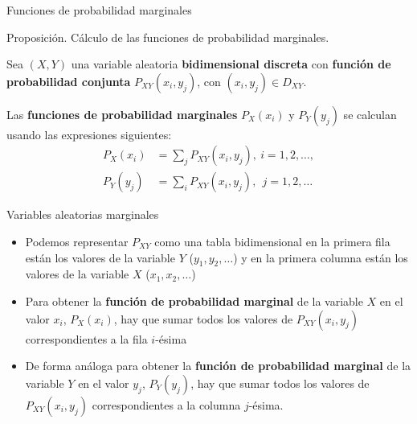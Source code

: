 \documentclass[ignorenonframetext,]{beamer}
\providecommand{\tightlist}{%
  \setlength{\itemsep}{0pt}\setlength{\parskip}{0pt}}
\begin{document}
\begin{frame}{Funciones de probabilidad marginales}
\protect\hypertarget{funciones-de-probabilidad-marginales}{}

Proposición. Cálculo de las funciones de probabilidad marginales.

Sea \((X,Y)\) una variable aleatoria \textbf{bidimensional discreta} con
\textbf{función de probabilidad conjunta} \(P_{XY}(x_i,y_j)\), con
\((x_i,y_j)\in D_{XY}\).

Las \textbf{funciones de probabilidad marginales} \(P_X(x_i)\) y
\(P_Y(y_j)\) se calculan usando las expresiones siguientes: \[
\displaystyle
\begin{array}{rl}
P_X(x_i)  & = \displaystyle\sum_{j} P_{XY}(x_i,y_j),\  i=1,2,\ldots,\\ P_Y(y_j) &  = \displaystyle\sum_{i} P_{XY}(x_i,y_j),\ \ j=1,2,\ldots
\end{array}
\]

\end{frame}

\begin{frame}{Variables aleatorias marginales}
\protect\hypertarget{variables-aleatorias-marginales}{}

\begin{itemize}
\tightlist
\item
  Podemos representar \(P_{XY}\) como una tabla bidimensional en la
  primera fila están los valores de la variable \(Y\)
  (\(y_1,y_2,\ldots\)) y en la primera columna están los valores de la
  variable \(X\) (\(x_1,x_2,\ldots\))
\item
  Para obtener la \textbf{función de probabilidad marginal} de la
  variable \(X\) en el valor \(x_i\), \(P_X(x_i)\), hay que sumar todos
  los valores de \(P_{XY}(x_i,y_j)\) correspondientes a la fila
  \(i\)-ésima
\item
  De forma análoga para obtener la \textbf{función de probabilidad
  marginal} de la variable \(Y\) en el valor \(y_j\), \(P_Y(y_j)\), hay
  que sumar todos los valores de \(P_{XY}(x_i,y_j)\) correspondientes a
  la columna \(j\)-ésima.
\end{itemize}

\end{frame}
\end{document}
